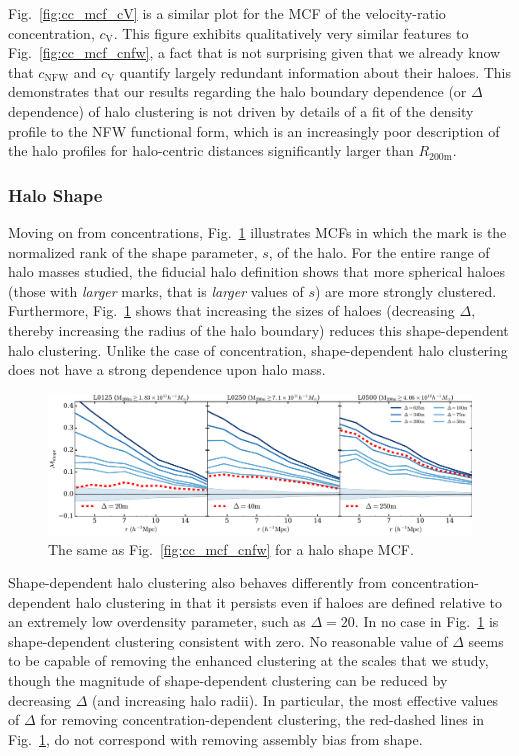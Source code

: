 \documentclass[usenatbib,fleqn]{mnras}
\begin{document}
Fig.~\ref{fig:cc_mcf_cV} is a similar plot for the MCF of the velocity-ratio concentration, $c_{\mathrm{V}}$. This figure exhibits qualitatively very similar features to Fig.~\ref{fig:cc_mcf_cnfw}, a fact that is not surprising given that we already know that $c_{\mathrm{NFW}}$ and $c_{\mathrm{V}}$ quantify largely redundant information about their haloes. This demonstrates that our results regarding the halo boundary dependence (or $\Delta$ dependence) of halo clustering is not driven by details of a fit of the density profile to the NFW functional form, which is an increasingly poor description of the halo profiles for halo-centric distances significantly larger than $R_{200\text{m}}$. 

\subsubsection{Halo Shape}

Moving on from concentrations, Fig.~\ref{fig:cc_mcf_s} illustrates MCFs in which the mark is the normalized rank of the shape parameter, $s$, of the halo. For the entire range of halo masses studied, the fiducial halo definition shows that more spherical haloes (those with {\em larger} marks, that is {\em larger} values of $s$) are more strongly clustered. Furthermore, Fig.~\ref{fig:cc_mcf_s} shows that increasing the sizes of haloes (decreasing $\Delta$, thereby increasing the radius of the halo boundary) reduces this shape-dependent halo clustering. Unlike the case of concentration, shape-dependent halo clustering does not have a strong dependence upon halo mass.

\begin{figure}
	\centering
	\includegraphics[width=\textwidth]{all_mcf_shape.pdf}
	\caption{
The same as Fig.~\ref{fig:cc_mcf_cnfw} for a halo shape MCF.
}
	\label{fig:cc_mcf_s}
\end{figure}


Shape-dependent halo clustering also behaves differently from concentration-dependent halo clustering in that it persists even if haloes are defined relative to an extremely low overdensity parameter, such as $\Delta=20$. In no case in Fig.~\ref{fig:cc_mcf_s} is shape-dependent clustering consistent with zero. No reasonable value of $\Delta$ seems to be capable of removing the enhanced clustering at the scales that we study, though the magnitude of shape-dependent clustering can be reduced by decreasing $\Delta$ (and increasing halo radii). In particular, the most effective values of $\Delta$ for removing concentration-dependent clustering, the red-dashed lines in Fig.~\ref{fig:cc_mcf_s}, do not correspond with removing assembly bias from shape. 
\end{document}
